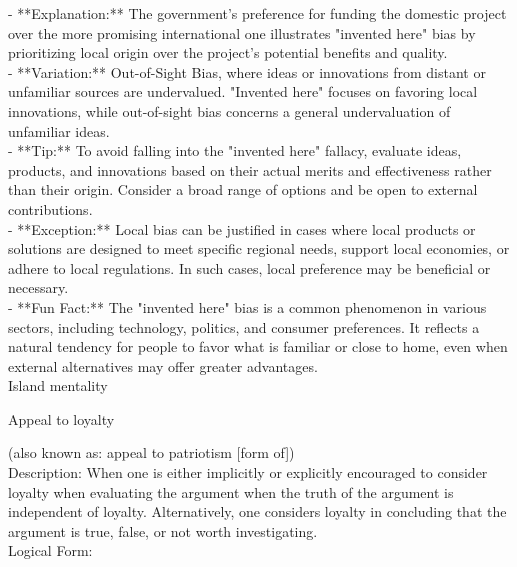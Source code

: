 \documentclass[a4paper,12pt,single,pdftex]{scrartcl}
\begin{document}
    
      - **Explanation:** The government’s preference for funding the domestic project over the more promising international one illustrates "invented here" bias by prioritizing local origin over the project’s potential benefits and quality.
    \\

    
      - **Variation:** Out-of-Sight Bias, where ideas or innovations from distant or unfamiliar sources are undervalued. "Invented here" focuses on favoring local innovations, while out-of-sight bias concerns a general undervaluation of unfamiliar ideas.
    \\

    
      - **Tip:** To avoid falling into the "invented here" fallacy, evaluate ideas, products, and innovations based on their actual merits and effectiveness rather than their origin. Consider a broad range of options and be open to external contributions.
    \\

    
      - **Exception:** Local bias can be justified in cases where local products or solutions are designed to meet specific regional needs, support local economies, or adhere to local regulations. In such cases, local preference may be beneficial or necessary.
    \\

    
      - **Fun Fact:** The "invented here" bias is a common phenomenon in various sectors, including technology, politics, and consumer preferences. It reflects a natural tendency for people to favor what is familiar or close to home, even when external alternatives may offer greater advantages.
    \\

  

Island mentality

Appeal to loyalty
    
      (also known as: appeal to patriotism [form of])
    \\

  
    
      
        Description: When one is either implicitly or explicitly encouraged to consider loyalty when evaluating the argument when the truth of the argument is independent of loyalty. Alternatively, one considers loyalty in concluding that the argument is true, false, or not worth investigating.
      \\

      
        Logical Form:
      \\
\end{document}
